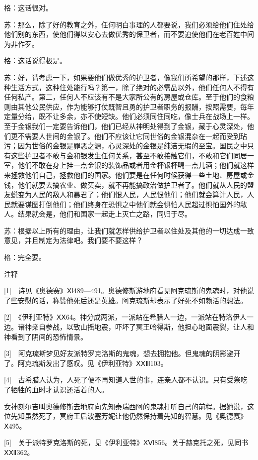 \documentclass[12pt,oneside]{book}
\begin{document}
格：这话很对。

苏：那么，除了好的教育之外，任何明白事理的人都要说，我们必须给他们住处给他们别的东西，使他们得以安心去做优秀的保卫者，而不要迫使他们在老百姓中间为非作歹。

格：这话说得极是。

苏：好，请考虑一下，如果要他们做优秀的护卫者，像我们所希望的那样，下述这种生活方式，这种住处能行吗？第一，除了绝对的必需品以外，他们任何人不得有任何私产。第二，任何人不应该有不是大家所公有的房屋或仓库。至于他们的食粮则由其他公民供应，作为能够打仗既智且勇的护卫者职务的报酬，按照需要，每年定量分给，既不让多余，亦不使短缺。他们必须同住同吃，像士兵在战场上一样。至于金银我们一定要告诉他们，他们已经从神明处得到了金银，藏于心灵深处，他们更不需要人世间的金银了。他们不应该让它同世俗的金银混杂在一起而受到玷污；因为世俗的金银是罪恶之源，心灵深处的金银是纯洁无瑕的至宝。国民之中只有这些护卫者不敢与金和银发生任何关系，甚至不敢接触它们，不敢和它们同居一室，他们不敢在身上挂一点金银的装饰品或者用金杯银杯喝一点儿酒；他们就这样来拯救他们自己，拯救他们的国家。他们要是在任何时候获得一些土地、房屋或金钱，他们就要去搞农业、做买卖，就不再能搞政治做护卫者了。他们就从人民的盟友蜕变为人民的敌人和暴君了；他们恨人民，人民恨他们；他们就会算计人民，人民就要谋图打倒他们；他们终身在恐惧之中他们就会惧怕人民超过惧怕国外的敌人。结果就会是，他们和国家一起走上灭亡之路，同归于尽。

苏：根据以上所有的理由，让我们就怎样供给护卫者以住处及其他的一切达成一致意见，并且制定为法律吧。我们要不要这样？

格：完全要。

注释

[1]　诗见《奥德赛》Ⅺ489—491。奥德修斯游地府看见阿克琉斯的鬼魂时，对他说了些安慰的话，称赞他死后还是英雄。阿克琉斯却表示了好死不如赖活的想法。

[2]　《伊利亚特》ⅩⅩ64。神分成两派，一派站在希腊人一边，一派站在特洛伊人一边。诸神亲自参战，以致山摇地震，吓坏了冥王哈得斯，他担心地面震裂，让人和神看到了阴间的恐怖情景。

[3]　阿克琉斯梦见好友派特罗克洛斯的鬼魂，想去拥抱他。但鬼魂的阴影避开了。阿克琉斯发出了感叹。见《伊利亚特》ⅩⅩⅢ103。

[4]　古希腊人认为，人死了便不再知道人世的事，连亲人都不认识。只有受祭吃了牺牲的血时才认识还活着的人。

女神刻尔吉叫奥德修斯去地府向先知泰瑞西阿的鬼魂打听自己的前程。据她说，这位先知虽然死了，冥府王后波塞芳妮让他仍然保持着先知的智慧。见《奥德赛》Ⅹ495。

[5]　关于派特罗克洛斯的死，见《伊利亚特》ⅩⅥ856。关于赫克托之死，见同书ⅩⅫ362。
\end{document}
